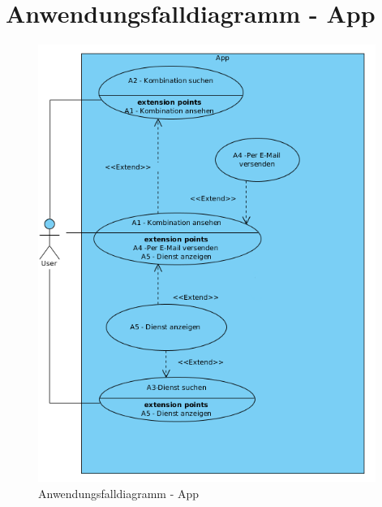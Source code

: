 \newpage
\section{Anwendungsfalldiagramm - App}

\begin{figure}[h]
	\centering
	\includegraphics[keepaspectratio,width=11cm]{img/app}
	\caption{Anwendungsfalldiagramm - App}
	\label{fig:anwendungsfalldiagramm-app}
\end{figure}

\newpage

